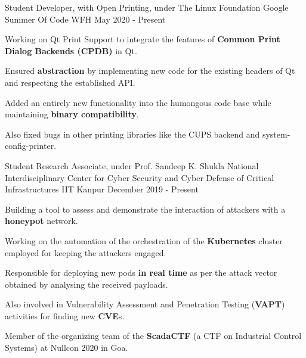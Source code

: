 \begin{cventries}
  \excventry
  {Student Developer, with Open Printing, under The Linux Foundation}
  {Google Summer Of Code}
  {WFH}
  {May 2020 - Present}
  {
    \begin{cvitems}
      \item Working on Qt Print Support to integrate the features of \textbf{Common Print Dialog Backends (CPDB)} in Qt.
      \item Ensured \textbf{abstraction} by implementing new code for the existing headers of Qt and respecting the established API.
      \item Added an entirely new functionality into the humongous code base while maintaining \textbf{binary compatibility}.
      \item Also fixed bugs in other printing libraries like the CUPS backend and  system-config-printer.
    \end{cvitems}
  }

  \excventry
  {Student Research Associate, under Prof. Sandeep K. Shukla}
  {National Interdisciplinary Center for Cyber Security and Cyber Defense of Critical Infrastructures}
  {IIT Kanpur}
  {December 2019 - Present}
  {
    \begin{cvitems}
      \item Building a tool to assess and demonstrate the interaction of attackers with a \textbf{honeypot} network.
      \item Working on the automation of the orchestration of the \textbf{Kubernetes} cluster employed for keeping the attackers engaged.
      \item Responsible for deploying new pods \textbf{in real time} as per the attack vector obtained by analysing the received payloads.
      \item Also involved in Vulnerability Assessment and Penetration Testing (\textbf{VAPT}) activities for finding new \textbf{CVE}s.
      \item Member of the organizing team of the \textbf{ScadaCTF} (a CTF on Industrial Control Systems) at Nullcon 2020 in Goa.
    \end{cvitems}
  }


\end{cventries}
